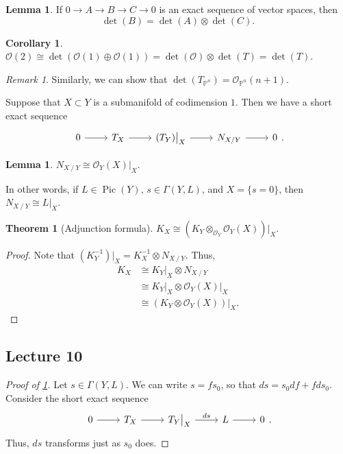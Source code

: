 \documentclass[10pt,letterpaper,cm]{nupset}
\theoremstyle{definition}
\theoremstyle{theorem}
\newtheorem{theorem}[defn]{Theorem}
\newtheorem{lemma}[defn]{Lemma}
\newtheorem{corollary}[defn]{Corollary}
\theoremstyle{remark}
\newtheorem{remark}[defn]{Remark}
\renewcommand{\O}{\mathcal O}
\renewcommand{\P}{\mathbb P}
\newcommand{\1}{\mathbb{1}}
\newcommand{\0}{\vec 0}
\DeclareMathOperator{\pic}{Pic}
\begin{document}
\begin{lemma}
If $0 \to A \to B \to C \to 0$ is an exact sequence of vector spaces, then $$\det(B) = \det(A) \otimes \det(C).$$
\end{lemma}

\begin{corollary}
$\O(2) \cong \det \left(\O(1) \oplus \O(1)\right) =\det(\O) \otimes \det(T) = \det(T)$.
\end{corollary}

\begin{remark}
Similarly, we can show that $\det\left(T_{\P^n}\right) =\O_{\P^n}(n+1)$.
\end{remark}

\medskip

Suppose that $X\subset Y$ is a submanifold of codimension $1$. Then we have a short exact sequence
\[
\begin{tikzcd}
0 \arrow[r] & T_X \arrow[r] & \left(T_Y\right)\bigr\rvert_X \arrow[r] & N_{X\mathbin{/}Y} \arrow[r] & 0
\end{tikzcd}.
\]

\begin{lemma}\label{norm}
$N_{X\mathbin{/}Y} \cong \O_Y\left(X\right)\bigr\rvert_X$.
\end{lemma}

In other words, if $L\in \pic(Y)$, $s\in \Gamma\left(Y, L\right)$, and $X = \{s=0\}$, then $N_{X\mathbin{/}Y} \cong L\bigr\rvert_X$.

\begin{theorem}[Adjunction formula]
$K_X \cong \left(K_Y \otimes_{\O_Y} \O_Y(X)\right)\bigr\rvert_X$.
\end{theorem}
\begin{proof}
Note that $\left(K_Y^{-1}\right)\bigr\rvert_X = K_X^{-1} \otimes N_{X\mathbin{/}Y}$. Thus,
\begin{align*}
K_X & \cong K_Y\bigr\rvert_X \otimes N_{X\mathbin{/}Y}  
\\ & \cong K_Y\bigr\rvert_X \otimes  \O_Y(X)\bigr\rvert_X
\\ & \cong \left(K_Y \otimes \O_Y(X)\right)\bigr\rvert_X
.\end{align*}
\end{proof}


\subsection{Lecture 10}

\begin{proof}[Proof of \cref{norm}]
Let $s\in \Gamma\left(Y, L\right)$. We can write $s = f{s_0}$, so that $d{s} = s_0d{f} + fd{s_0}$. Consider the short exact sequence
\[
\begin{tikzcd}
0 \arrow[r] & T_X \arrow[r] & T_Y\bigr\rvert_X \arrow[r, "ds"] & L \arrow[r] & 0
\end{tikzcd}.
\] Thus, $ds$ transforms just as $s_0$ does.
\end{proof}
\end{document}
